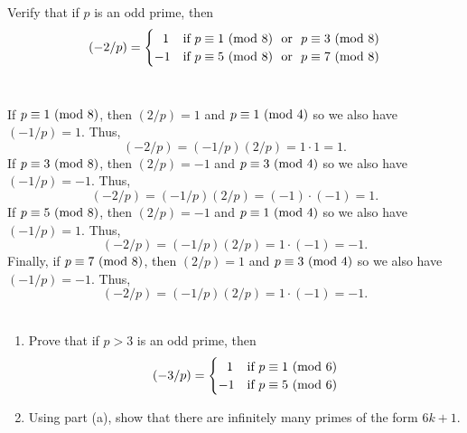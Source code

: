 \begin{exercise}
    Verify that if $p$ is an odd prime, then
    $$(-2/p) = \begin{cases}
        \ \ 1 & \text{if } p \equiv 1 \ (\mathrm{mod}\ 8) \ \text{ or } \ p \equiv 3 \ (\mathrm{mod}\ 8) \\
        -1 & \text{if } p \equiv 5 \ (\mathrm{mod}\ 8) \ \text{ or } \ p \equiv 7 \ (\mathrm{mod}\ 8)
    \end{cases}$$ \\
\end{exercise}

\begin{solution}
    If $p \equiv 1 \ (\mathrm{mod}\ 8)$, then $(2/p) = 1$ and $p \equiv 1 \ (\mathrm{mod}\ 4)$ so we also have $(-1/p) = 1$. Thus,
    $$(-2/p) = (-1/p)(2/p) = 1 \cdot 1 = 1.$$
    If $p \equiv 3 \ (\mathrm{mod}\ 8)$, then $(2/p) = -1$ and $p \equiv 3 \ (\mathrm{mod}\ 4)$ so we also have $(-1/p) = -1$. Thus,
    $$(-2/p) = (-1/p)(2/p) = (-1) \cdot (-1) = 1.$$
    If $p \equiv 5 \ (\mathrm{mod}\ 8)$, then $(2/p) = -1$ and $p \equiv 1 \ (\mathrm{mod}\ 4)$ so we also have $(-1/p) = 1$. Thus,
    $$(-2/p) = (-1/p)(2/p) = 1 \cdot (-1) = -1.$$
    Finally, if $p \equiv 7 \ (\mathrm{mod}\ 8)$, then $(2/p) = 1$ and $p \equiv 3 \ (\mathrm{mod}\ 4)$ so we also have $(-1/p) = -1$. Thus,
    $$(-2/p) = (-1/p)(2/p) = 1 \cdot (-1) = -1.$$ \\
\end{solution}

\begin{exercise}
    \begin{enumerate}
        \item Prove that if $p > 3$ is an odd prime, then
        $$(-3/p) = \begin{cases}
            \ \ 1 & \text{if } p \equiv 1 \ (\mathrm{mod}\ 6) \\
            -1 & \text{if } p \equiv 5 \ (\mathrm{mod}\ 6)
        \end{cases}$$
        \item Using part (a), show that there are infinitely many primes of the form $6k+1$.  \\
    \end{enumerate}
\end{exercise}

